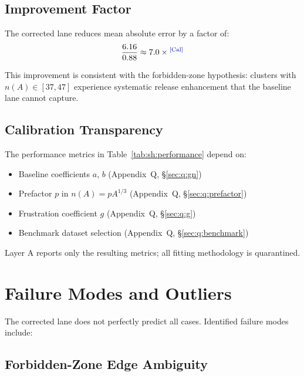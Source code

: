 \subsection{Improvement Factor}

The corrected lane reduces mean absolute error by a factor of:
\begin{equation}
    \frac{6.16}{0.88} \approx 7.0 \times \tagCal
\end{equation}

This improvement is consistent with the forbidden-zone hypothesis: clusters
with $n(A) \in [37, 47]$ experience systematic release enhancement that the
baseline lane cannot capture. \tagP

\subsection{Calibration Transparency}

\begin{quarantinebox}[title=Appendix Q Reference]
    The performance metrics in Table~\ref{tab:sh:performance} depend on:
    \begin{itemize}
        \item Baseline coefficients $a$, $b$ (Appendix~Q, \S\ref{sec:q:gn})
        \item Prefactor $p$ in $n(A) = p A^{1/3}$ (Appendix~Q, \S\ref{sec:q:prefactor})
        \item Frustration coefficient $g$ (Appendix~Q, \S\ref{sec:q:g})
        \item Benchmark dataset selection (Appendix~Q, \S\ref{sec:q:benchmark})
    \end{itemize}
    Layer A reports only the resulting metrics; all fitting methodology is
    quarantined.
\end{quarantinebox}

\section{Failure Modes and Outliers}
\label{sec:sh:failures}

The corrected lane does not perfectly predict all cases. Identified failure
modes include:

\subsection{Forbidden-Zone Edge Ambiguity}

